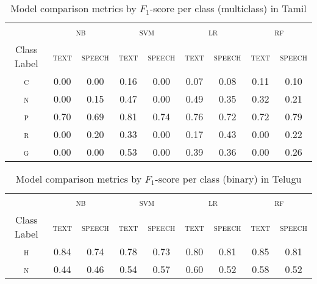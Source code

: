\documentclass[11pt]{article}
\begin{document}
     \begin{table*}[]
        \caption{\label{tab:multiclass_tamil} Model comparison metrics by $F_1$-score per class (multiclass) in Tamil}
        \centering
        \begin{tabular}{ccccccccc}
            \hline
            \multicolumn{1}{c}{} & \multicolumn{2}{c}{\textsc{nb}} & \multicolumn{2}{c}{\textsc{svm}} & \multicolumn{2}{c}{\textsc{lr}} & \multicolumn{2}{c}{\textsc{rf}} \\
            Class Label & \textsc{text} & \textsc{speech} & \textsc{text} & \textsc{speech} & \textsc{text} & \textsc{speech} & \textsc{text} & \textsc{speech}  \\
            \hline
            \textsc{c} & 0.00 & 0.00 & 0.16 & 0.00 & 0.07 & 0.08 & 0.11 & 0.10 \\
            \textsc{n} & 0.00 & 0.15 & 0.47 & 0.00 & 0.49 & 0.35 & 0.32 & 0.21 \\
            \textsc{p} & 0.70 & 0.69 & 0.81 & 0.74 & 0.76 & 0.72 & 0.72 & 0.79 \\
            \textsc{r} & 0.00 & 0.20 & 0.33 & 0.00 & 0.17 & 0.43 & 0.00 & 0.22 \\
            \textsc{g} & 0.00 & 0.00 & 0.53 & 0.00 & 0.39 & 0.36 & 0.00 & 0.26 \\
            \hline
         \end{tabular}
     \end{table*}

    \begin{table*}[]
        \caption{\label{tab:binary_telugu} Model comparison metrics by $F_1$-score per class (binary) in Telugu}
        \centering
        \begin{tabular}{ccccccccc}
            \hline
            \multicolumn{1}{c}{} & \multicolumn{2}{c}{\textsc{nb}} & \multicolumn{2}{c}{\textsc{svm}} & \multicolumn{2}{c}{\textsc{lr}} & \multicolumn{2}{c}{\textsc{rf}} \\
            Class Label & \textsc{text} & \textsc{speech} & \textsc{text} & \textsc{speech} & \textsc{text} & \textsc{speech} & \textsc{text} & \textsc{speech}  \\
            \hline
            \textsc{h} & 0.84 & 0.74 & 0.78 & 0.73 & 0.80 & 0.81 & 0.85 & 0.81 \\
            \textsc{n} & 0.44 & 0.46 & 0.54 & 0.57 & 0.60 & 0.52 & 0.58 & 0.52 \\
            \hline
         \end{tabular}
     \end{table*} 
\end{document}
